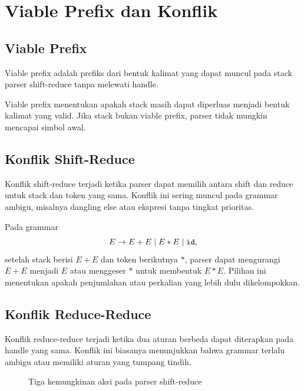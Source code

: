 \section{Viable Prefix dan Konflik}
\label{sec:ch11-viable}

\subsection{Viable Prefix}

\begin{definisi}
Viable prefix adalah prefiks dari bentuk kalimat yang dapat muncul
pada stack parser shift-reduce tanpa melewati handle.
\end{definisi}

Viable prefix menentukan apakah stack masih dapat diperluas menjadi
bentuk kalimat yang valid. Jika stack bukan viable prefix, parser
tidak mungkin mencapai simbol awal.

\subsection{Konflik Shift-Reduce}

Konflik shift-reduce terjadi ketika parser dapat memilih antara
shift dan reduce untuk stack dan token yang sama. Konflik ini sering
muncul pada grammar ambigu, misalnya dangling else atau ekspresi
tanpa tingkat prioritas.

\begin{contoh}
Pada grammar
\[
E \to E + E \mid E * E \mid \texttt{id},
\]
setelah stack berisi \(E + E\) dan token berikutnya \(*\), parser
dapat mengurangi \(E + E\) menjadi \(E\) atau menggeser \(*\)
untuk membentuk \(E * E\). Pilihan ini menentukan apakah
penjumlahan atau perkalian yang lebih dulu dikelompokkan.
\end{contoh}

\subsection{Konflik Reduce-Reduce}

Konflik reduce-reduce terjadi ketika dua aturan berbeda dapat
diterapkan pada handle yang sama. Konflik ini biasanya menunjukkan
bahwa grammar terlalu ambigu atau memiliki aturan yang tumpang
tindih.

\begin{figure}[H]
\centering
{}
\caption{Tiga kemungkinan aksi pada parser shift-reduce}
\label{fig:ch11-actions}
\end{figure}

